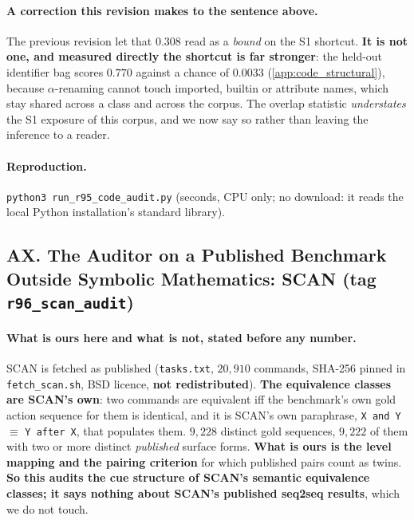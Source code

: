 \paragraph{A correction this revision makes to the sentence above.} The previous revision let that $0.308$ read as a \emph{bound} on the S1 shortcut. \textbf{It is not one, and measured directly the shortcut is far stronger}: the held-out identifier bag scores $0.770$ against a chance of $0.0033$ (\ref{app:code_structural}), because $\alpha$-renaming cannot touch imported, builtin or attribute names, which stay shared across a class and across the corpus. The overlap statistic \emph{understates} the S1 exposure of this corpus, and we now say so rather than leaving the inference to a reader.

\paragraph{Reproduction.} \texttt{python3 run\_r95\_code\_audit.py} (seconds, CPU only; no download: it reads the local Python installation's standard library).


\subsection*{AX. The Auditor on a Published Benchmark Outside Symbolic Mathematics: SCAN (tag \texttt{r96\_scan\_audit})}

\paragraph{What is ours here and what is not, stated before any number.} SCAN \citep{lake2018generalization} is fetched as published (\texttt{tasks.txt}, $20{,}910$ commands, SHA-256 pinned in \texttt{fetch\_scan.sh}, BSD licence, \textbf{not redistributed}). \textbf{The equivalence classes are SCAN's own}: two commands are equivalent iff the benchmark's own gold action sequence for them is identical, and it is SCAN's own paraphrase, \texttt{X and Y} $\equiv$ \texttt{Y after X}, that populates them. $9{,}228$ distinct gold sequences, $9{,}222$ of them with two or more distinct \emph{published} surface forms. \textbf{What is ours is the level mapping and the pairing criterion} for which published pairs count as twins. \textbf{So this audits the cue structure of SCAN's semantic equivalence classes; it says nothing about SCAN's published seq2seq results}, which we do not touch.


